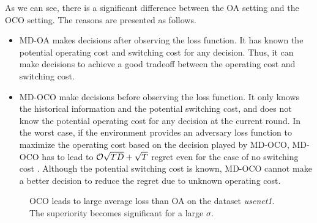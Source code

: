 \documentclass[journal]{IEEEtran}
\begin{document}
As we can see, there is a significant difference between the OA setting and the OCO setting. The reasons are presented as follows.
\begin{itemize}
\item MD-OA makes decisions after observing the loss function. It has known the potential operating cost and switching cost for any decision. Thus, it can make decisions to achieve a good tradeoff between the operating cost and switching cost.  
\item MD-OCO make decisions before observing the loss function. It only knows the  historical information and the potential switching cost, and does not know the potential operating cost for any decision at the current round. In the worst case, if the environment provides an adversary loss function to maximize the operating cost based on the decision played by MD-OCO, MD-OCO has to lead to ${\mathcal{O}}{\sqrt{TD}+\sqrt{T}}$ regret even for the case of no switching cost \cite{Gyorgy:2016}. Although the potential switching cost is known, MD-OCO cannot make a better decision to reduce the regret due to unknown operating cost. 
\end{itemize}



\begin{figure*}[!]
\setlength{\abovecaptionskip}{0pt}
\setlength{\belowcaptionskip}{0pt}
\centering 
{}
\caption{ OCO leads to large average loss than OA on the dataset \textit{usenet1}. The superiority becomes significant for a large $\sigma$. }
\label{figure_ave_loss_real_usenet1}
\end{figure*}
\end{document}
